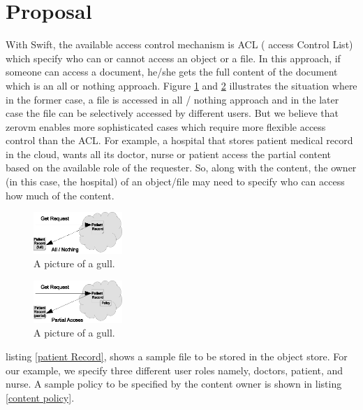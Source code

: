 \section{Proposal}

With Swift, the available access control mechanism is  ACL ( access Control List) which specify who can or cannot access an object or a file. In this approach, if someone can access a document, he/she gets the full content of the document which is an all or nothing approach.  Figure \ref{fig:swift_file} and \ref{fig:zwift_file}  illustrates the situation where in the former case, a file is accessed in all / nothing approach and in the later case the file can be selectively accessed by different users. But we believe that   zerovm enables more sophisticated cases which require more flexible access control than the ACL. For example,  a hospital that stores patient medical record in the cloud,  wants all its doctor, nurse or patient access the partial content based on the available role of the requester.  So, along with the content, the owner (in this case, the hospital) of an object/file may need to specify who can access how much of the content.

\begin{figure}[h!] 
\label{fig:swift_file}
  \centering
    \includegraphics[width=0.3\textwidth]{eps/swift_file}
 \caption{A picture of a gull.}
\end{figure}

\begin{figure}[h!]
\label {fig:zwift_file} 
  \centering
    \includegraphics[width=0.3\textwidth]{eps/zwift_file}
 \caption{A picture of a gull.}
\end{figure}




listing \ref{patient Record}, shows a sample file to be stored in the object store. For our example, we specify three different user roles namely, doctors, patient, and nurse.
A sample policy to be specified by the content owner is shown in listing \ref{content policy}.



